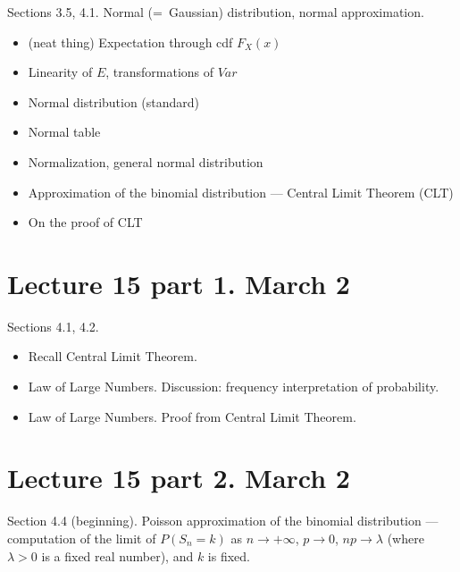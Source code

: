 \documentclass[letterpaper,11pt,oneside,reqno]{amsart}
\numberwithin{equation}{section}
\theoremstyle{definition}
\begin{document}
Sections 3.5, 4.1. 
Normal (=~Gaussian) distribution, normal approximation.
\begin{itemize}
	\item (neat thing) Expectation through cdf $F_X(x)$
	\item Linearity of $E$, transformations of $Var$
	\item Normal distribution (standard)
	\item Normal table
	\item Normalization, general normal distribution
	\item Approximation of the binomial distribution --- Central Limit Theorem (CLT)
	\item On the proof of CLT
\end{itemize}

\section*{Lecture 15 part 1. March 2}

Sections 4.1, 4.2.
\begin{itemize}
	\item Recall Central Limit Theorem. 
	\item Law of Large Numbers. Discussion: frequency interpretation of probability.
	\item Law of Large Numbers. Proof from Central Limit Theorem.
\end{itemize}

\section*{Lecture 15 part 2. March 2}

Section 4.4 (beginning). Poisson approximation of the binomial distribution
--- computation of the limit of 
$P(S_n=k)$ as $n\to+\infty$, $p\to0$, $np\to\lambda$ (where $\lambda>0$ is a fixed real
number), and $k$ is fixed.
\end{document}
